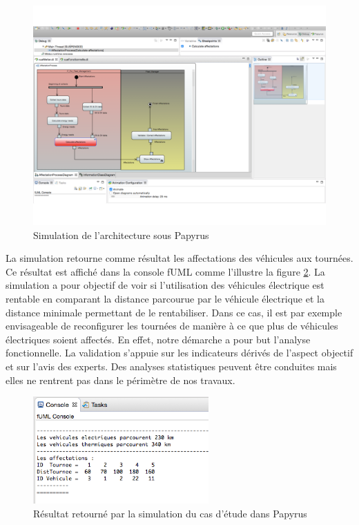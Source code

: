 \begin{figure}[!htbp]
 \begin{center}
  \includegraphics[angle=90, width=1\textwidth]{figures/5_implementation/simu_capture_ecran.pdf}
 \end{center}
 \caption{Simulation de l'architecture sous Papyrus}
 \label{fig:simu_capture_ecran}
\end{figure}

La simulation retourne comme résultat les affectations des véhicules aux
tournées. Ce résultat est affiché dans la console fUML comme l'illustre la
figure \ref{fig:resultat_simu}. La simulation a pour objectif de voir si
l'utilisation des véhicules électrique est rentable en comparant la distance
parcourue par le véhicule électrique et la distance minimale permettant de le
rentabiliser. Dans ce cas, il est par exemple envisageable de reconfigurer les
tournées de manière à ce que plus de véhicules électriques soient affectés. En
effet, notre démarche a pour but l'analyse fonctionnelle. La validation s'appuie
sur les indicateurs dérivés de l'aspect objectif et sur l'avis des experts. Des
analyses statistiques peuvent être conduites mais elles ne rentrent pas dans le
périmètre de nos travaux.

\begin{figure}[!htbp]
 \begin{center}
  \includegraphics[width=0.6\textwidth]{figures/5_implementation/resultat_simu.png}
 \end{center}
 \caption{Résultat retourné par la simulation du cas d'étude dans Papyrus}
 \label{fig:resultat_simu}
\end{figure} 

